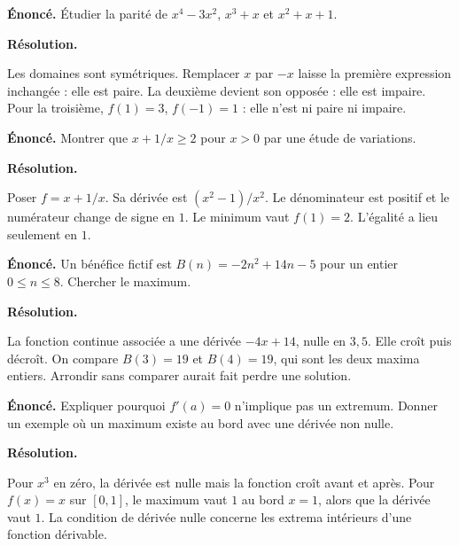 \documentclass[11pt,a4paper]{article}
\begin{document}
\par\noindent\begin{minipage}{\linewidth}
{\small\color{Muted}\textbf{Énoncé.} Étudier la parité de $x^4-3x^2$, $x^3+x$ et $x^2+x+1$.}
\par\medskip
\textbf{Résolution.}\par
Les domaines sont symétriques. Remplacer $x$ par $-x$ laisse la première expression inchangée : elle est paire. La deuxième devient son opposée : elle est impaire. Pour la troisième, $f(1)=3$, $f(-1)=1$ : elle n’est ni paire ni impaire.
\end{minipage}\par
\par\noindent\begin{minipage}{\linewidth}
{\small\color{Muted}\textbf{Énoncé.} Montrer que $x+1/x\ge2$ pour $x>0$ par une étude de variations.}
\par\medskip
\textbf{Résolution.}\par
Poser $f=x+1/x$. Sa dérivée est $(x^2-1)/x^2$. Le dénominateur est positif et le numérateur change de signe en $1$. Le minimum vaut $f(1)=2$. L’égalité a lieu seulement en $1$.
\end{minipage}\par
\par\noindent\begin{minipage}{\linewidth}
{\small\color{Muted}\textbf{Énoncé.} Un bénéfice fictif est $B(n)=-2n^2+14n-5$ pour un entier $0\le n\le8$. Chercher le maximum.}
\par\medskip
\textbf{Résolution.}\par
La fonction continue associée a une dérivée $-4x+14$, nulle en $3,5$. Elle croît puis décroît. On compare $B(3)=19$ et $B(4)=19$, qui sont les deux maxima entiers. Arrondir sans comparer aurait fait perdre une solution.
\end{minipage}\par
\par\noindent\begin{minipage}{\linewidth}
{\small\color{Muted}\textbf{Énoncé.} Expliquer pourquoi $f\prime(a)=0$ n’implique pas un extremum. Donner un exemple où un maximum existe au bord avec une dérivée non nulle.}
\par\medskip
\textbf{Résolution.}\par
Pour $x^3$ en zéro, la dérivée est nulle mais la fonction croît avant et après. Pour $f(x)=x$ sur $[0,1]$, le maximum vaut $1$ au bord $x=1$, alors que la dérivée vaut $1$. La condition de dérivée nulle concerne les extrema intérieurs d’une fonction dérivable.
\end{minipage}\par
\end{document}
